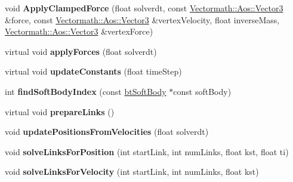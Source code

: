 \begin{DoxyCompactItemize}
\item 
\mbox{\label{classbtDX11SoftBodySolver_a48b489fba2b4a4efb4472f5add51bc0e}} 
void {\bfseries Apply\+Clamped\+Force} (float solverdt, const \hyperlink{classVectormath_1_1Aos_1_1Vector3}{Vectormath\+::\+Aos\+::\+Vector3} \&force, const \hyperlink{classVectormath_1_1Aos_1_1Vector3}{Vectormath\+::\+Aos\+::\+Vector3} \&vertex\+Velocity, float inverse\+Mass, \hyperlink{classVectormath_1_1Aos_1_1Vector3}{Vectormath\+::\+Aos\+::\+Vector3} \&vertex\+Force)
\item 
\mbox{\label{classbtDX11SoftBodySolver_add8ce1d22fa454695703e7ab2d2dfece}} 
virtual void {\bfseries apply\+Forces} (float solverdt)
\item 
\mbox{\label{classbtDX11SoftBodySolver_a2399437c364aa862cb860ec84dcfd3f9}} 
virtual void {\bfseries update\+Constants} (float time\+Step)
\item 
\mbox{\label{classbtDX11SoftBodySolver_ad84c2d73165e5e3e4f50e06791f5859c}} 
int {\bfseries find\+Soft\+Body\+Index} (const \hyperlink{classbtSoftBody}{bt\+Soft\+Body} $\ast$const soft\+Body)
\item 
\mbox{\label{classbtDX11SoftBodySolver_a263828836bda16681d534089824079c1}} 
virtual void {\bfseries prepare\+Links} ()
\item 
\mbox{\label{classbtDX11SoftBodySolver_ac76f41d29e21606203a3c571427fa6fc}} 
void {\bfseries update\+Positions\+From\+Velocities} (float solverdt)
\item 
\mbox{\label{classbtDX11SoftBodySolver_aacbf031c178776f7fcab836b02b269d9}} 
void {\bfseries solve\+Links\+For\+Position} (int start\+Link, int num\+Links, float kst, float ti)
\item 
\mbox{\label{classbtDX11SoftBodySolver_a369e42f30a6c6a1b7cab882e55fb6dd7}} 
void {\bfseries solve\+Links\+For\+Velocity} (int start\+Link, int num\+Links, float kst)
\item 
\mbox{\label{classbtDX11SoftBodySolver_a42608b88bf8addfe8709db7cc8d8af8c}} 

\end{DoxyCompactItemize}
